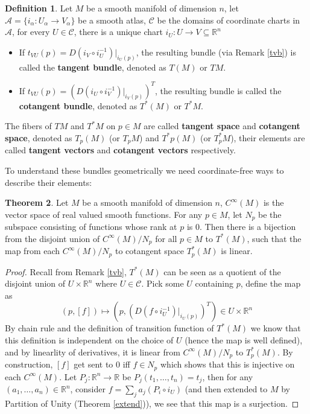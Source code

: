 \documentclass{article}
\theoremstyle{definition}
\newtheorem{thm}{Theorem}[section]
\newtheorem{dfn}[thm]{Definition}
\begin{document}
\begin{dfn}\label{tancot}
    Let $M$ be a smooth manifold of dimension $n$, let $\mathcal{A}=\{i_\alpha: U_\alpha\rightarrow V_\alpha\}$ be a smooth atlas, $\mathcal{C}$ be the domains of coordinate charts in $\mathcal{A}$, for every $U\in\mathcal{C}$, there is a unique chart $i_U: U\rightarrow V\subseteq\mathbb{R}^n$
    \begin{itemize}
    \item If $t_{VU}(p)=D(i_V\circ i_U^{-1})|_{i_U(p)}$, the resulting bundle (via Remark \ref{tvb}) is called the {\bf tangent bundle}, denoted as $T(M)$ or $TM$.
    \item If $t_{VU}(p)=(D(i_U\circ i_V^{-1})|_{i_V(p)})^T$, the resulting bundle is called the {\bf cotangent bundle}, denoted as $T^*(M)$ or $T^*M$.
    \end{itemize}
    The fibers of $TM$ and $T^*M$ on $p\in M$ are called {\bf tangent space} and {\bf cotangent space}, denoted as $T_p(M)$ (or $T_pM$) and $T^*p(M)$ (or $T^*_pM$), their elements are called {\bf tangent vectors} and {\bf cotangent vectors} respectively. 
\end{dfn}

To understand these bundles geometrically we need coordinate-free ways to describe their elements:

\begin{thm}\label{coordfree1}
    Let $M$ be a smooth manifold of dimension $n$, $C^\infty(M)$ is the vector space of real valued smooth functions. For any $p\in M$, let $N_p$ be the subspace consisting of functions whose rank at $p$ is $0$. Then there is a bijection from the disjoint union of $C^\infty(M)/N_p$ for all $p\in M$ to $T^*(M)$, such that the map from each $C^\infty(M)/N_p$ to cotangent space $T^*_p(M)$ is linear.
\end{thm}

\begin{proof}
    Recall from Remark \ref{tvb}, $T^*(M)$ can be seen as a quotient of the disjoint union of $U\times\mathbb{R}^n$ where $U\in\mathcal{C}$. Pick some $U$ containing $p$, define the map as \[(p, [f])\mapsto (p, (D(f\circ i_U^{-1})|_{i_U(p)})^T)\in U\times\mathbb{R}^n\]
    By chain rule and the definition of transition function of $T^*(M)$ we know that this definition is independent on the choice of $U$ (hence the map is well defined), and by linearlity of derivatives, it is linear from $C^\infty(M)/N_p$ to $T^*_p(M)$. By construction, $[f]$ get sent to $0$ iff $f\in N_p$ which shows that this is injective on each $C^\infty(M)$. Let $P_j: \mathbb{R}^n\rightarrow \mathbb{R}$ be $P_j(t_1, \dots, t_n)=t_j$, then for any $(a_1, \dots, a_n)\in \mathbb{R}^n$, consider $f=\sum_ja_j(P_i\circ i_U)$ (and then extended to $M$ by Partition of Unity (Theorem \ref{extend})), we see that this map is a surjection.
\end{proof}
\end{document}
